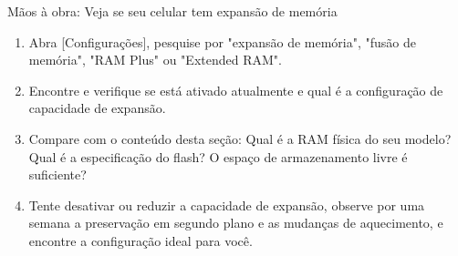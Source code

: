 \begin{tcbpractice}{Mãos à obra: Veja se seu celular tem expansão de memória}
\begin{enumerate}
  \item Abra [Configurações], pesquise por "expansão de memória", "fusão de memória", "RAM Plus" ou "Extended RAM".
  \item Encontre e verifique se está ativado atualmente e qual é a configuração de capacidade de expansão.
  \item Compare com o conteúdo desta seção: Qual é a RAM física do seu modelo? Qual é a especificação do flash? O espaço de armazenamento livre é suficiente?
  \item Tente desativar ou reduzir a capacidade de expansão, observe por uma semana a preservação em segundo plano e as mudanças de aquecimento, e encontre a configuração ideal para você.
\end{enumerate}

\end{tcbpractice}
